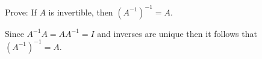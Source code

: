 
\begin{Exercise}[
name={},
title={}, 
difficulty=0,
origin={\cite{KK}}]
Prove: If $A$ is invertible, then $\left( A^{-1}\right) ^{-1}=A.$ 
\end{Exercise}

\begin{Answer}
Since $A^{-1}A=AA^{-1}=I$ and inverses are unique then it follows that
$\left( A^{-1}\right) ^{-1}=A$.
\end{Answer}
